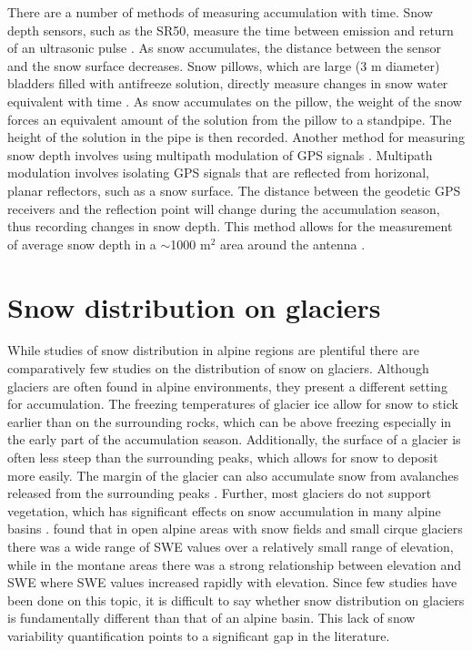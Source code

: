 \documentclass{sfuthesis}
\begin{document}
There are a number of methods of measuring accumulation with time. Snow depth sensors, such as the SR50, measure the time between emission and return of an ultrasonic pulse \citep{Ryan2008}. As snow accumulates, the distance between the sensor and the snow surface decreases. Snow pillows, which are large (3 m diameter) bladders filled with antifreeze solution, directly measure changes in snow water equivalent with time \citep{Archer1995}. As snow accumulates on the pillow, the weight of the snow forces an equivalent amount of the solution from the pillow to a standpipe. The height of the solution in the pipe is then recorded. Another method for measuring snow depth involves using multipath modulation of GPS signals \citep{Larson2009,McCreight2014}. Multipath modulation involves isolating GPS signals that are reflected from horizonal, planar reflectors, such as a snow surface. The distance between the geodetic GPS receivers and the reflection point will change during the accumulation season, thus recording changes in snow depth. This method allows for the measurement of average snow depth in a $\sim$1000 m$^2$ area around the antenna \citep{McCreight2014}.

\section{Snow distribution on glaciers}
While studies of snow distribution in alpine regions are plentiful \citep[and sources within]{Clark2011} there are comparatively few studies on the distribution of snow on glaciers. Although glaciers are often found in alpine environments, they present a different setting for accumulation. The freezing temperatures of glacier ice allow for snow to stick earlier than on the surrounding rocks, which can be above freezing especially in the early part of the accumulation season. Additionally, the surface of a glacier is often less steep than the surrounding peaks, which allows for snow to deposit more easily. The margin of the glacier can also accumulate snow from avalanches released from the surrounding peaks \citep{Bloschl1991, Mott2008}. Further, most glaciers do not support vegetation, which has significant effects on snow accumulation in many alpine basins \citep{Pomeroy1999}. \cite{Alford1985} found that in open alpine areas with snow fields and small cirque glaciers there was a wide range of SWE values over a relatively small range of elevation, while in the montane areas there was a strong relationship between elevation and SWE where SWE values increased rapidly with elevation. Since few studies have been done on this topic, it is difficult to say whether snow distribution on glaciers is fundamentally different than that of an alpine basin. This lack of snow variability quantification points to a significant gap in the literature.
\end{document}
